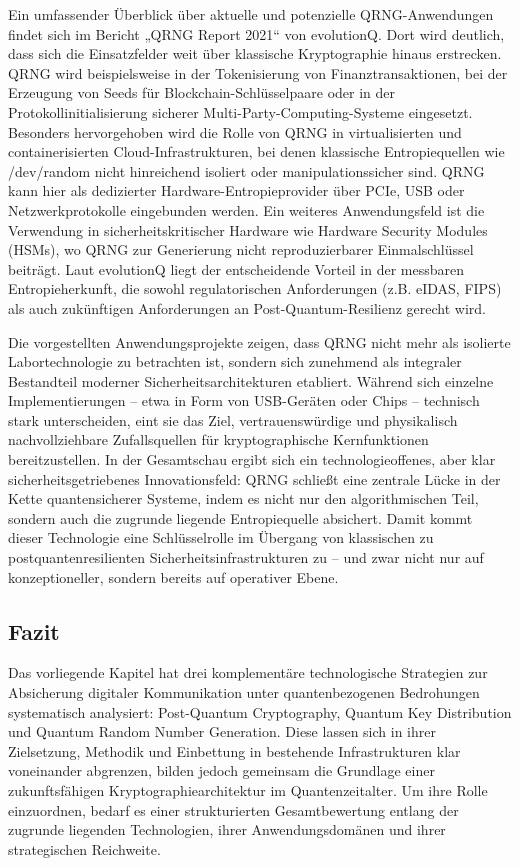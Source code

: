 Ein umfassender Überblick über aktuelle und potenzielle QRNG-Anwendungen findet sich im Bericht „QRNG Report 2021“ von evolutionQ. Dort wird deutlich, dass sich die Einsatzfelder weit über klassische Kryptographie hinaus erstrecken. QRNG wird beispielsweise in der Tokenisierung von Finanztransaktionen, bei der Erzeugung von Seeds für Blockchain-Schlüsselpaare oder in der Protokollinitialisierung sicherer Multi-Party-Computing-Systeme eingesetzt. Besonders hervorgehoben wird die Rolle von QRNG in virtualisierten und containerisierten Cloud-Infrastrukturen, bei denen klassische Entropiequellen wie /dev/random nicht hinreichend isoliert oder manipulationssicher sind. QRNG kann hier als dedizierter Hardware-Entropieprovider über PCIe, USB oder Netzwerkprotokolle eingebunden werden. Ein weiteres Anwendungsfeld ist die Verwendung in sicherheitskritischer Hardware wie Hardware Security Modules (HSMs), wo QRNG zur Generierung nicht reproduzierbarer Einmalschlüssel beiträgt. Laut evolutionQ liegt der entscheidende Vorteil in der messbaren Entropieherkunft, die sowohl regulatorischen Anforderungen (z.B. eIDAS, FIPS) als auch zukünftigen Anforderungen an Post-Quantum-Resilienz gerecht wird.


Die vorgestellten Anwendungsprojekte zeigen, dass QRNG nicht mehr als isolierte Labortechnologie zu betrachten ist, sondern sich zunehmend als integraler Bestandteil moderner Sicherheitsarchitekturen etabliert. Während sich einzelne Implementierungen – etwa in Form von USB-Geräten oder Chips – technisch stark unterscheiden, eint sie das Ziel, vertrauenswürdige und physikalisch nachvollziehbare Zufallsquellen für kryptographische Kernfunktionen bereitzustellen. In der Gesamtschau ergibt sich ein technologieoffenes, aber klar sicherheitsgetriebenes Innovationsfeld: QRNG schließt eine zentrale Lücke in der Kette quantensicherer Systeme, indem es nicht nur den algorithmischen Teil, sondern auch die zugrunde liegende Entropiequelle absichert. Damit kommt dieser Technologie eine Schlüsselrolle im Übergang von klassischen zu postquantenresilienten Sicherheitsinfrastrukturen zu – und zwar nicht nur auf konzeptioneller, sondern bereits auf operativer Ebene.

\subsection{Fazit}
Das vorliegende Kapitel hat drei komplementäre technologische Strategien zur Absicherung digitaler Kommunikation unter quantenbezogenen Bedrohungen systematisch analysiert: Post-Quantum Cryptography, Quantum Key Distribution und Quantum Random Number Generation. Diese lassen sich in ihrer Zielsetzung, Methodik und Einbettung in bestehende Infrastrukturen klar voneinander abgrenzen, bilden jedoch gemeinsam die Grundlage einer zukunftsfähigen Kryptographiearchitektur im Quantenzeitalter. Um ihre Rolle einzuordnen, bedarf es einer strukturierten Gesamtbewertung entlang der zugrunde liegenden Technologien, ihrer Anwendungsdomänen und ihrer strategischen Reichweite.

